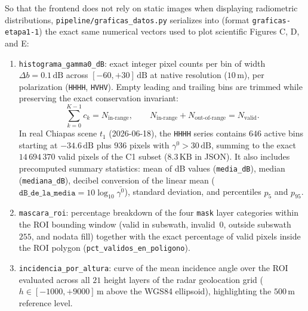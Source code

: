 \documentclass[11pt,a4paper]{article}
\newcommand{\src}[1]{\nolinkurl{#1}}
\newcommand{\unit}[1]{\mathrm{#1}}
\newcommand{\gz}{\ensuremath{\gamma^{0}}}
\begin{document}
So that the frontend does not rely on static images when displaying radiometric distributions,
\src{pipeline/graficas\_datos.py} serializes into  (format \texttt{graficas-etapa1-1}) the
exact same numerical vectors used to plot scientific Figures C, D, and E:
\begin{enumerate}
  \item \texttt{histograma\_gamma0\_dB}: exact integer pixel counts per bin of width $\Delta b = 0.1\,\unit{dB}$
        across $[-60, +30]\,\unit{dB}$ at native resolution ($10\,\unit{m}$), per polarization
        (\texttt{HHHH}, \texttt{HVHV}). Empty leading and trailing bins are trimmed while preserving the exact
        conservation invariant:
        \begin{equation}
          \sum_{k=0}^{K-1} c_k = N_{\text{in-range}}, \qquad
          N_{\text{in-range}} + N_{\text{out-of-range}} = N_{\text{valid}}.
          \label{eq:invariante-histograma-etapa1}
        \end{equation}
        In real Chiapas scene $t_1$ (2026-06-18), the \texttt{HHHH} series contains $646$ active bins starting at
        $-34.6\,\unit{dB}$ plus $936$ pixels with $\gz > 30\,\unit{dB}$, summing to the exact $14\,694\,370$ valid
        pixels of the C1 subset ($8.3\,\unit{KB}$ in JSON). It also includes precomputed summary statistics:
        mean of dB values (\texttt{media\_dB}), median (\texttt{mediana\_dB}), decibel conversion of the linear
        mean ($\texttt{dB\_de\_la\_media} = 10\log_{10}\bar{\gz}$), standard deviation, and percentiles $p_5$ and
        $p_{95}$.
  \item \texttt{mascara\_roi}: percentage breakdown of the four \texttt{mask} layer categories within the ROI
        bounding window (valid in subswath, invalid~$0$, outside subswath~$255$, and nodata fill) together with
        the exact percentage of valid pixels inside the ROI polygon (\texttt{pct\_validos\_en\_poligono}).
  \item \texttt{incidencia\_por\_altura}: curve of the mean incidence angle over the ROI evaluated across all $21$
        height layers of the radar geolocation grid ($h \in [-1000, +9000]\,\unit{m}$ above the WGS84 ellipsoid),
        highlighting the $500\,\unit{m}$ reference level.
\end{enumerate}
\end{document}
